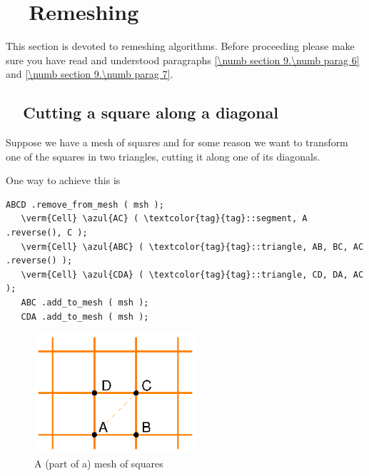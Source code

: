 
\chapter{~~Remeshing}\label{\numb section 10}

This section is devoted to remeshing algorithms.
Before proceeding please make sure you have read and understood paragraphs
\ref{\numb section 9.\numb parag 6} and \ref{\numb section 9.\numb parag 7}.


\section{~~Cutting a square along a diagonal}\label{\numb section 10.\numb parag 1}

Suppose we have a mesh of squares and for some reason we want to transform one of the
squares in two triangles, cutting it along one of its diagonals.

One way to achieve this is

\begin{Verbatim}[commandchars=\\\{\},formatcom=\small\tt,frame=single,
   label=parag-\ref{\numb section 10.\numb parag 1}.cpp,rulecolor=\color{moldura},
   baselinestretch=0.94,framesep=2mm]
   ABCD .remove_from_mesh ( msh );
   \verm{Cell} \azul{AC} ( \textcolor{tag}{tag}::segment, A .reverse(), C );
   \verm{Cell} \azul{ABC} ( \textcolor{tag}{tag}::triangle, AB, BC, AC .reverse() );
   \verm{Cell} \azul{CDA} ( \textcolor{tag}{tag}::triangle, CD, DA, AC );
   ABC .add_to_mesh ( msh );
   CDA .add_to_mesh ( msh );
\end{Verbatim}

\begin{figure}[ht] \centering
  \includegraphics[width=60mm]{malha-quadr}
  \caption{A (part of a) mesh of squares}
  \label{\numb section 10.\numb fig 1}
\end{figure}

